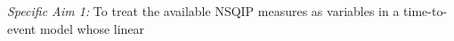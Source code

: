 \emph{Specific Aim 1:} To treat the available NSQIP measures as variables in a time-to-event model whose linear 